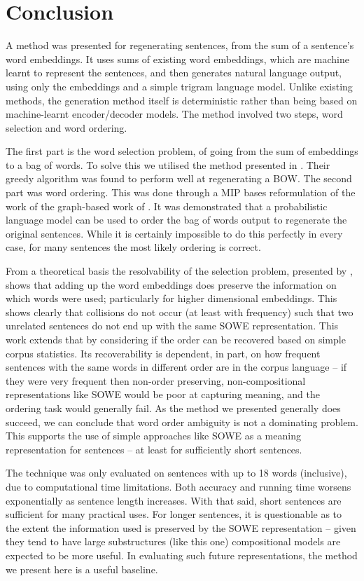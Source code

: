 \documentclass[compsoc]{IEEEtran}
\theoremstyle{plain}
\theoremstyle{definition}
\begin{document}
\section{Conclusion} \label{conclusion}
A method was presented for regenerating sentences, from the sum of a sentence's word embeddings. It uses sums of existing word embeddings, which are machine learnt to represent the sentences, and then generates natural language output, using only the embeddings and a simple trigram language model. Unlike existing methods, the generation method itself is deterministic rather than being based on machine-learnt encoder/decoder models. The method involved two steps, word selection and word ordering.

The first part is  the word selection problem, of going from the sum of embeddings to a bag of words. To solve this we utilised the method presented in \textcite{White2015BOWgen}. Their greedy algorithm was found to perform well at regenerating a BOW. The second part was word ordering. This was done through a MIP bases reformulation of the work of the graph-based work of \textcite{Horvat2014}. It was demonstrated that a probabilistic language model can be used to order the bag of words output to regenerate the original sentences. While it is certainly impossible to do this perfectly in every case, for many sentences the most likely ordering is correct.

From a theoretical basis the resolvability of the selection problem, presented by \textcite{White2015BOWgen}, shows that adding up the word embeddings does preserve the information on which words were used; particularly for higher dimensional embeddings. This shows clearly that collisions do not occur (at least with frequency) such that two unrelated sentences do not end up with the same SOWE representation. 
This work extends that by considering if the order can be recovered based on simple corpus statistics. Its recoverability is dependent, in part, on how frequent sentences with the same words in different order are in the corpus language -- if they were very frequent then non-order preserving, non-compositional representations like SOWE would be poor at capturing meaning, and the ordering task would generally fail. As the method we presented generally does succeed, we can conclude that word order ambiguity is not a dominating problem. This supports the use of simple approaches like SOWE as a meaning representation for sentences -- at least for sufficiently short sentences.

The technique was only evaluated on sentences with up to 18 words (inclusive), due to computational time limitations. Both accuracy and running time worsens exponentially as sentence length increases. With that said, short sentences are sufficient for many practical uses. For longer sentences, it is questionable as to the extent the information used is preserved by the SOWE representation -- given they tend to have large substructures (like this one) compositional models are expected to be more useful. In evaluating such future representations, the method we present here is a useful baseline.
\end{document}
